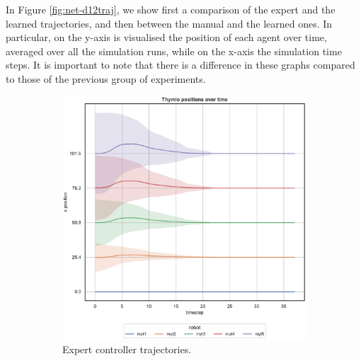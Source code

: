 In Figure \ref{fig:net-d12traj}, we show first a comparison of the expert and the 
learned trajectories, and then between the manual and the learned ones. 
In particular, on the y-axis is visualised the position of each agent over time, 
averaged over all the simulation runs, while on the x-axis the simulation 
time steps. It is important to note that there is a difference in these graphs 
compared to those of the previous group of experiments. 
\begin{figure}[!htb]
	\begin{center}
		\begin{subfigure}[h]{0.49\textwidth}
			\centering
			\includegraphics[width=.95\textwidth]{contents/images/net-d12/position-overtime-omniscient}%
			\caption{Expert controller trajectories.}
		\end{subfigure}
		\hfill
		\begin{subfigure}[h]{0.49\textwidth}
			\centering

\end{subfigure}
\end{center}
\end{figure}
